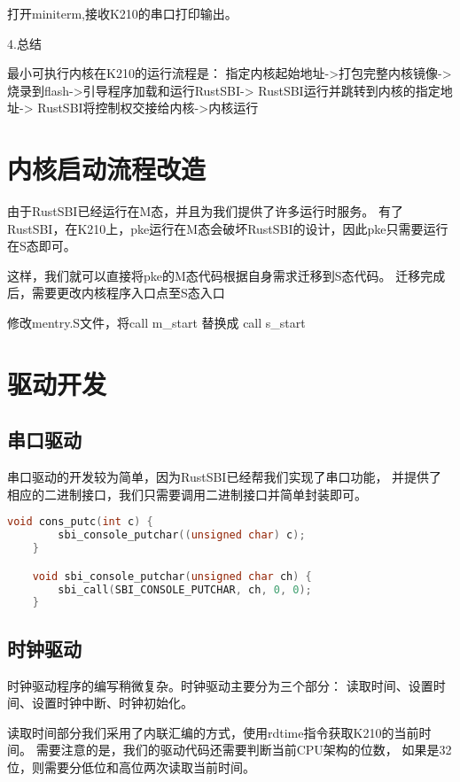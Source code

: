 打开miniterm,接收K210的串口打印输出。

4.总结

最小可执行内核在K210的运行流程是：
指定内核起始地址->打包完整内核镜像->
烧录到flash->引导程序加载和运行RustSBI->
RustSBI运行并跳转到内核的指定地址->
RustSBI将控制权交接给内核->内核运行

\section{内核启动流程改造}

由于RustSBI已经运行在M态，并且为我们提供了许多运行时服务。
有了RustSBI，在K210上，pke运行在M态会破坏RustSBI的设计，因此pke只需要运行在S态即可。

这样，我们就可以直接将pke的M态代码根据自身需求迁移到S态代码。
迁移完成后，需要更改内核程序入口点至S态入口

修改mentry.S文件，将call m\_start 替换成 call s\_start

\section{驱动开发}

\subsection{串口驱动}

串口驱动的开发较为简单，因为RustSBI已经帮我们实现了串口功能，
并提供了相应的二进制接口，我们只需要调用二进制接口并简单封装即可。

\begin{lstlisting}[caption={串口驱动}, label={lst:uart_driver}, language=C]
    void cons_putc(int c) {
        sbi_console_putchar((unsigned char) c);
    }    

    void sbi_console_putchar(unsigned char ch) {
        sbi_call(SBI_CONSOLE_PUTCHAR, ch, 0, 0);
    }    
\end{lstlisting}

\subsection{时钟驱动}

时钟驱动程序的编写稍微复杂。时钟驱动主要分为三个部分：
读取时间、设置时间、设置时钟中断、时钟初始化。

读取时间部分我们采用了内联汇编的方式，使用rdtime指令获取K210的当前时间。
需要注意的是，我们的驱动代码还需要判断当前CPU架构的位数，
如果是32位，则需要分低位和高位两次读取当前时间。


